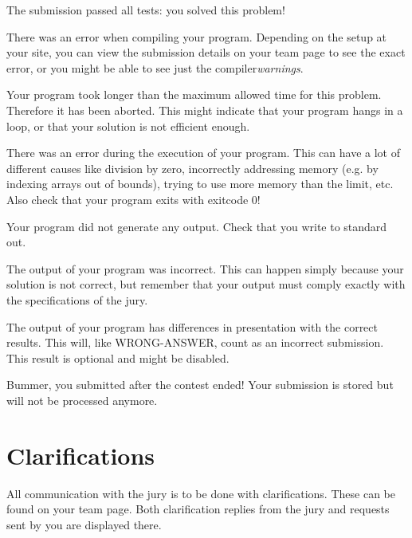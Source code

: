 \begin{description}[\setleftmargin{4.5cm}]
\item[CORRECT]
The submission passed all tests: you solved this problem!

\item[COMPILER-ERROR]
There was an error when compiling your program. Depending on the setup
at your site, you can view the submission details on your team page to
see the exact error, or you might be able to see just the
compiler\emph{warnings}.

\item[TIMELIMIT]
Your program took longer than the maximum allowed time for this
problem. Therefore it has been aborted. This might indicate that your
program hangs in a loop, or that your solution is not efficient
enough.

\item[RUN-ERROR]
There was an error during the execution of your program. This can have
a lot of different causes like division by zero, incorrectly
addressing memory (e.g. by indexing arrays out of bounds), trying to
use more memory than the limit, etc. 
Also check that your program exits with exitcode 0!

\item[NO-OUTPUT]
Your program did not generate any output. Check that you write to
standard out.

\item[WRONG-ANSWER]
The output of your program was incorrect. This can happen simply
because your solution is not correct, but remember that your output
must comply exactly with the specifications of the jury.

\item[PRESENTATION-ERROR]
The output of your program has differences in presentation with the
correct results. This will, like WRONG-ANSWER, count as an incorrect
submission. This result is optional and might be disabled.

\item[TOO-LATE]
Bummer, you submitted after the contest ended! Your submission is stored but
will not be processed anymore.
\end{description}

\section{Clarifications}

All communication with the jury is to be done with clarifications.
These can be found on your team page. Both clarification replies from
the jury and requests sent by you are displayed there.

